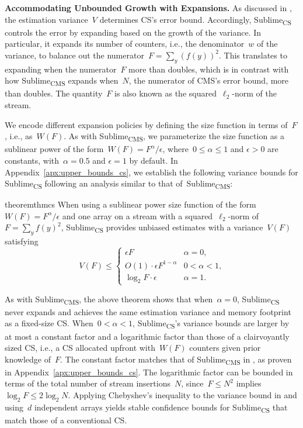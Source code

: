 \documentclass[sigconf]{acmart}
\newcommand{\sketch}{Sublime}
\newcommand{\sketchcms}{\sketch\textsubscript{CMS}\xspace}
\newcommand{\sketchcs}{\sketch\textsubscript{CS}\xspace}
\begin{document}
\textbf{Accommodating Unbounded Growth with Expansions.}
As discussed in , the estimation variance~$V$ determines CS's error bound.
Accordingly, \sketchcs controls the error by expanding based on the growth of the variance.
In particular, it expands its number of counters, i.e., the denominator~$w$ of the variance, to balance out the numerator~$F=\sum_{y} (f(y))^2$.
This translates to expanding when the numerator~$F$ more than doubles, which is in contrast with how \sketchcms expands when~$N$, the numerator of CMS's error bound, more than doubles.
The quantity~$F$ is also known as the squared~$\ell_2$-norm of the stream.

We encode different expansion policies by defining the size function in terms of~$F$, i.e., as~$W(F)$.
As with \sketchcms, we parameterize the size function as a sublinear power of the form~$W(F)=F^\alpha/\epsilon$, where~$0 \leq \alpha \leq 1$ and $\epsilon > 0$ are constants, with~$\alpha=0.5$ and $\epsilon=1$ by default.
In Appendix~\ref{apx:upper_bounds_cs}, we establish the following variance bounds for \sketchcs following an analysis similar to that of~\sketchcms:
\begin{restatable}{theorem}{thmcs}
    \label{thm:cs-w}
    When using a sublinear power size function of the form~$W(F)=F^\alpha/\epsilon$ and one array on a stream with a squared~$\ell_2${\nobreakdash-}norm of~$F = \sum_y f(y)^2$, \sketchcs provides unbiased estimates with a variance~$V(F)$ satisfying
	$$
    V(F) \leq  
    \begin{cases}
        \epsilon F & \text{$\alpha=0$,} \\
        O(1) \cdot \epsilon F^{1-\alpha} & \text{$0<\alpha<1$,} \\
        \log_2 F \cdot \epsilon & \text{$\alpha=1$.}
	\end{cases}
    $$
\end{restatable}
\noindent
As with \sketchcms, the above theorem shows that when~$\alpha=0$, \sketchcs never expands and achieves the same estimation variance and memory footprint as a fixed-size CS.
When~$0<\alpha<1$, \sketchcs's variance bounds are larger by at most a constant factor and a logarithmic factor than those of a clairvoyantly sized CS, i.e., a CS allocated upfront with~$W(F)$ counters given prior knowledge of~$F$.
The constant factor matches that of \sketchcms in , as proven in Appendix~\ref{apx:upper_bounds_cs}.
The logarithmic factor can be bounded in terms of the total number of stream insertions~$N$, since~$F \leq N^2$ implies~$\log_2 F \leq 2\log_2 N$.
Applying Chebyshev's inequality to the variance bound in  and using~$d$ independent arrays yields stable confidence bounds for \sketchcs that match those of a conventional CS.
\end{document}
